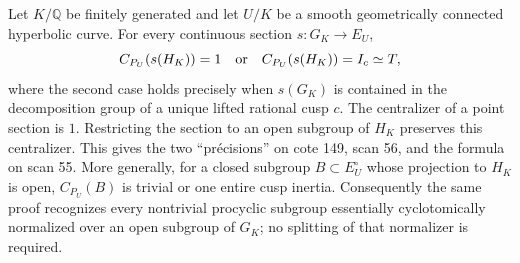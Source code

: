 \begin{proposition}
\label{F-centralizer}
Let $K/\mathbb Q$ be finitely generated and let $U/K$ be a smooth
geometrically connected hyperbolic curve. For every continuous section
$s:G_K\to E_U$,
\[
 C_{P_U}(s(H_K))=1
 \quad\hbox{or}\quad
 C_{P_U}(s(H_K))=I_c\simeq T,
\]
where the second case holds precisely when $s(G_K)$ is contained in
the decomposition group of a unique lifted rational cusp $c$.
The centralizer of a point section is $1$. Restricting the section to
an open subgroup of $H_K$ preserves this centralizer. This gives the
two ``pr\'ecisions'' on cote 149, scan 56, and the formula on scan 55.
More generally, for a closed subgroup $B\subset E_U^{\circ}$
whose projection to $H_K$ is open, $C_{P_U}(B)$ is trivial or
one entire cusp inertia. Consequently the same proof recognizes
every nontrivial procyclic subgroup essentially cyclotomically
normalized over an open subgroup of $G_K$; no splitting of that
normalizer is required.
\end{proposition}
